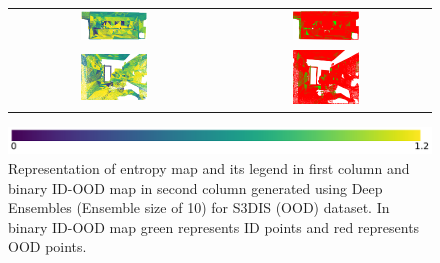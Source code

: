 \begin{figure}[h!]
\begin{tabular}{cc}
            \includegraphics[width=0.33\textwidth, height=0.18\textheight]{images/ood_imgs/de_s3dis/pnt_1_de_ent.pdf}& 
            \includegraphics[width=0.33\textwidth, height=0.18\textheight]{images/ood_imgs/de_s3dis/de_ent_3.pdf}\\

            \includegraphics[width=0.33\textwidth, height=0.18\textheight]{images/ood_imgs/de_s3dis/ofc_42_de_ent.pdf}& 
            \includegraphics[width=0.33\textwidth, height=0.18\textheight]{images/ood_imgs/de_s3dis/de_ent_1.pdf}\\
        \end{tabular}
        \includegraphics[scale=0.45]{images/ent_legend.pdf}
        \caption{Representation of entropy map and its legend in first column and binary ID-OOD map in second column generated using Deep Ensembles (Ensemble size of 10) for S3DIS (OOD) dataset. In binary ID-OOD map green represents ID points and red represents OOD points.}
        \label{fig:de_s3dis_oodmap_ent}
    \end{figure}
